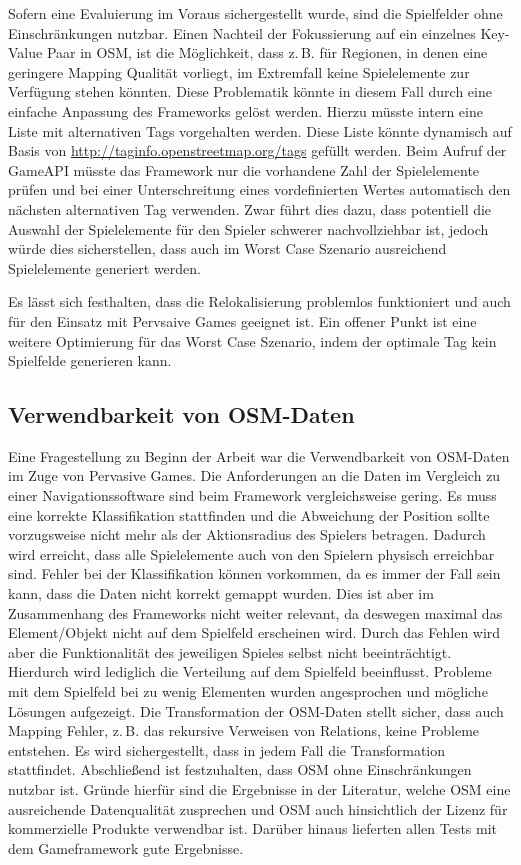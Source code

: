 Sofern eine Evaluierung im Voraus sichergestellt wurde, sind die Spielfelder ohne Einschränkungen nutzbar.
Einen Nachteil der Fokussierung auf ein einzelnes Key-Value Paar in OSM, ist die Möglichkeit, dass z.\,B. für Regionen, in denen eine geringere Mapping Qualität vorliegt, im Extremfall keine Spielelemente zur Verfügung stehen könnten. Diese Problematik könnte in diesem Fall durch eine einfache Anpassung des Frameworks gelöst werden. Hierzu müsste intern eine Liste mit alternativen Tags vorgehalten werden. Diese Liste könnte dynamisch auf Basis von \url{http://taginfo.openstreetmap.org/tags} gefüllt werden. Beim Aufruf der GameAPI müsste das Framework nur die vorhandene Zahl der Spielelemente prüfen und bei einer Unterschreitung eines vordefinierten Wertes automatisch den nächsten alternativen Tag verwenden. Zwar führt dies dazu, dass potentiell die Auswahl der Spielelemente für den Spieler schwerer nachvollziehbar ist, jedoch würde dies sicherstellen, dass auch im Worst Case Szenario ausreichend Spielelemente generiert werden.

Es lässt sich festhalten, dass die Relokalisierung problemlos funktioniert und auch für den Einsatz mit Pervsaive Games geeignet ist. Ein offener Punkt ist eine weitere Optimierung für das Worst Case Szenario, indem der optimale Tag kein Spielfelde generieren kann.

\subsection*{Verwendbarkeit von OSM-Daten}

Eine Fragestellung zu Beginn der Arbeit war die Verwendbarkeit von OSM-Daten im Zuge von Pervasive Games.
Die Anforderungen an die Daten im Vergleich zu einer Navigationssoftware sind beim Framework vergleichsweise gering.
Es muss eine korrekte Klassifikation stattfinden und die Abweichung der Position sollte vorzugsweise nicht mehr als der Aktionsradius des Spielers betragen. Dadurch wird erreicht, dass alle Spielelemente auch von den Spielern physisch erreichbar sind.
Fehler bei der Klassifikation können vorkommen, da es immer der Fall sein kann, dass die Daten nicht korrekt gemappt wurden.
Dies ist aber im Zusammenhang des Frameworks nicht weiter relevant, da deswegen maximal das Element/Objekt nicht auf dem Spielfeld erscheinen wird. Durch das Fehlen wird aber die Funktionalität des jeweiligen Spieles selbst nicht beeinträchtigt. Hierdurch wird lediglich die Verteilung auf dem Spielfeld beeinflusst. Probleme mit dem Spielfeld bei zu wenig Elementen wurden angesprochen und mögliche Lösungen aufgezeigt.
Die Transformation der OSM-Daten stellt sicher, dass auch Mapping Fehler, z.\,B. das rekursive Verweisen von Relations, keine Probleme entstehen. Es wird sichergestellt, dass in jedem Fall die Transformation stattfindet.
Abschließend ist festzuhalten, dass OSM ohne Einschränkungen nutzbar ist.
Gründe hierfür sind die Ergebnisse in der Literatur, welche OSM eine ausreichende Datenqualität zusprechen und OSM auch hinsichtlich der Lizenz für kommerzielle Produkte verwendbar ist. Darüber hinaus lieferten allen Tests mit dem Gameframework gute Ergebnisse. 


